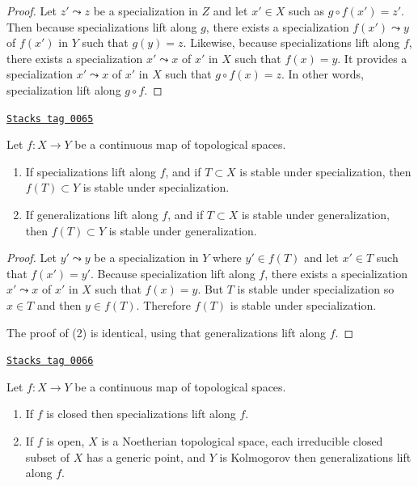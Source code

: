 \begin{proof}
Let $z'\leadsto z$ be a specialization in $Z$ and let $x' \in X$ such as
$g\circ f (x') = z'$. Then because specializations lift along $g$, there exists
a specialization $f(x') \leadsto y$ of $f(x')$ in $Y$ such that $g(y) = z$.
Likewise, because specializations lift along $f$, there exists a specialization
$x' \leadsto x$ of $x'$ in $X$ such that $f(x) = y$. It provides a
specialization $x' \leadsto x$ of $x'$ in $X$ such that $g\circ f(x) = z$. In
other words, specialization lift along $g\circ f$.
\end{proof}

\begin{lemma}
\label{topology-lemma-lift-specializations-images}
\href{https://stacks.math.columbia.edu/tag/0065}{\texttt{Stacks tag 0065}}

Let $f : X \to Y$ be a continuous map of topological spaces.
\begin{enumerate}
\item If specializations lift along $f$, and if $T \subset X$
is stable under specialization, then $f(T) \subset Y$ is
stable under specialization.
\item If generalizations lift along $f$, and if $T \subset X$
is stable under generalization, then $f(T) \subset Y$ is
stable under generalization.
\end{enumerate}
\end{lemma}

\begin{proof}
Let $y' \leadsto y$ be a specialization in $Y$ where $y'\in f(T)$ and let
$x'\in T$ such that $f(x') = y'$. Because specialization lift along $f$, there
exists a specialization $x'\leadsto x$ of $x'$ in $X$ such that $f(x) = y$. But
$T$ is stable under specialization so $x\in T$ and then $y \in f(T)$. Therefore
$f(T)$ is stable under specialization.

\medskip\noindent
The proof of (2) is identical, using that generalizations lift along $f$.
\end{proof}

\begin{lemma}
\label{topology-lemma-closed-open-map-specialization}
\href{https://stacks.math.columbia.edu/tag/0066}{\texttt{Stacks tag 0066}}

Let $f : X \to Y$ be a continuous map of topological spaces.
\begin{enumerate}
\item If $f$ is closed then specializations lift along $f$.
\item If $f$ is open, $X$ is a Noetherian topological space,
each irreducible closed subset of $X$ has a generic point,
and $Y$ is Kolmogorov then generalizations lift along $f$.
\end{enumerate}
\end{lemma}

